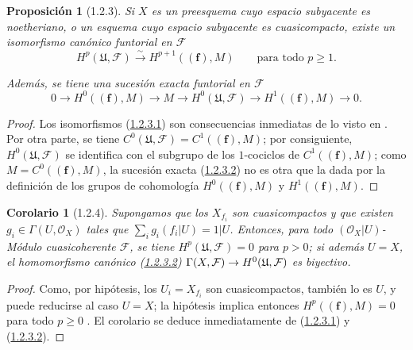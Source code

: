 \documentclass[10pt,oneside,openany]{book}
\theoremstyle{egaenv}\newtheorem*{env}{---}
\theoremstyle{egastatement}
\newtheorem*{proposition}{Proposición}
\newtheorem*{corollary}{Corolario}
\theoremstyle{egadescription}
\newcommand{\oldpage}[2][]{\marginnote{\normalfont\scriptsize\textbf{#1}\,|\,#2}\ignorespaces}
\renewcommand{\geq}{\geqslant}
\renewcommand{\to}{\mathchoice{\longrightarrow}{\rightarrow}{\rightarrow}{\rightarrow}}
\begin{document}
\begin{proposition}[1.2.3]
\label{III.1.2.3}
\label{III.1.2.3-fr}
Si $X$ es un preesquema cuyo espacio subyacente es noetheriano, o un esquema cuyo espacio subyacente es cuasicompacto, existe un isomorfismo canónico funtorial en $\mathcal F$
\begin{equation}
\label{III.1.2.3.1-fr}
\tag{1.2.3.1}
H^p(\mathfrak U,\mathcal F)\xrightarrow{\sim}H^{p+1}((\mathbf f),M)
\qquad\text{para todo }p\geq1.
\end{equation}

Además, se tiene una sucesión exacta funtorial en $\mathcal F$
\begin{equation}
\label{III.1.2.3.2-fr}
\tag{1.2.3.2}
0\longrightarrow H^0((\mathbf f),M)\longrightarrow M
\longrightarrow H^0(\mathfrak U,\mathcal F)
\longrightarrow H^1((\mathbf f),M)\longrightarrow0.
\end{equation}
\end{proposition}

\oldpage[III]{87}
\begin{proof}
Los isomorfismos (\hyperref[III.1.2.3.1]{1.2.3.1}) son consecuencias inmediatas de lo visto en .
Por otra parte, se tiene $C^0(\mathfrak U,\mathcal F)=C^1((\mathbf f),M)$; por consiguiente, $H^0(\mathfrak U,\mathcal F)$ se identifica con el subgrupo de los $1$-cociclos de $C^1((\mathbf f),M)$; como $M=C^0((\mathbf f),M)$, la sucesión exacta (\hyperref[III.1.2.3.2]{1.2.3.2}) no es otra que la dada por la definición de los grupos de cohomología $H^0((\mathbf f),M)$ y $H^1((\mathbf f),M)$.
\end{proof}

\begin{corollary}[1.2.4]
\label{III.1.2.4}
\label{III.1.2.4-fr}
Supongamos que los $X_{f_i}$ son cuasicompactos y que existen $g_i\in\Gamma(U,\mathcal O_X)$ tales que
$\sum_i g_i(f_i\vert U)=1\vert U$. Entonces, para todo
$(\mathcal O_X\vert U)$-Módulo cuasicoherente $\mathcal F$, se tiene $H^p(\mathfrak U,\mathcal F)=0$ para $p>0$; si además $U=X$, el homomorfismo canónico \textup{(\hyperref[III.1.2.3.2]{1.2.3.2})} $\Gamma(X,\mathcal F)\to H^0(\mathfrak U,\mathcal F)$ es biyectivo.
\end{corollary}

\begin{proof}
Como, por hipótesis, los $U_i=X_{f_i}$ son cuasicompactos, también lo es $U$, y puede reducirse al caso $U=X$; la hipótesis implica entonces
$H^p((\mathbf f),M)=0$ para todo $p\geq0$ .
El corolario se deduce inmediatamente de (\hyperref[III.1.2.3.1]{1.2.3.1}) y (\hyperref[III.1.2.3.2]{1.2.3.2}).
\end{proof}
\end{document}
